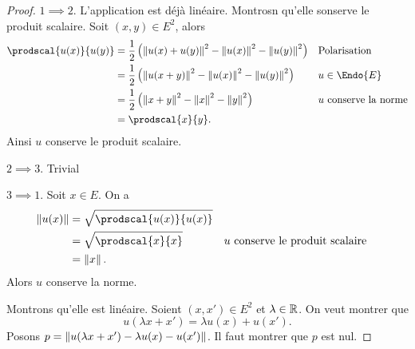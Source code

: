 \begin{proof}
  $1 \implies 2$. L'application est déjà linéaire. Montrosn qu'elle sonserve le produit scalaire. Soit $(x,y) \in E^2$, alors
  \begin{align}
    \prodscal{u(x)}{u(y)} &= \frac{1}{2}\left(\norme{u(x)+u(y)}^2 - \norme{u(x)}^2 - \norme{u(y)}^2\right) && \text{Polarisation} \\
    &=\frac{1}{2}\left(\norme{u(x+y)}^2 - \norme{u(x)}^2 - \norme{u(y)}^2\right) && u \in \Endo{E} \\
    &=\frac{1}{2}\left(\norme{x+y}^2 - \norme{x}^2 - \norme{y}^2\right) && u \text{~conserve la norme} \\    
    &=\prodscal{x}{y}.
  \end{align}
  Ainsi $u$ conserve le produit scalaire.

  $2 \implies 3$. Trivial

  $3 \implies 1$. Soit $x \in E$. On a
  \begin{align}
    \norme{u(x)} &= \sqrt{\prodscal{u(x)}{u(x)}}\\
    &=\sqrt{\prodscal{x}{x}} && u\text{~conserve le produit scalaire}\\
    &=\norme{x}.
  \end{align}
  Alors $u$ conserve la norme. 

  Montrons qu'elle est linéaire. Soient $(x,x') \in E^2$ et $\lambda \in \mathbb{R}$. On veut montrer que
  \begin{equation}
    u(\lambda x+x')=\lambda u(x)+u(x').
  \end{equation}
  Posons $p=\left\lVert u(\lambda x+x')-\lambda u(x)-u(x')\right\rVert$. Il faut montrer que $p$ est nul.


\end{proof}
